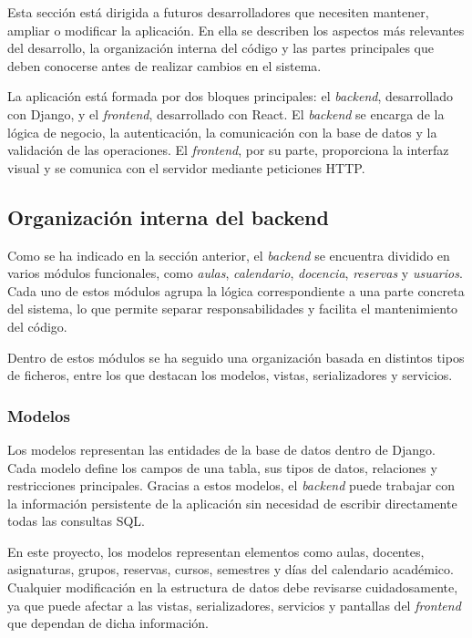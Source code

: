 Esta sección está dirigida a futuros desarrolladores que necesiten mantener, ampliar o modificar la aplicación. En ella se describen los aspectos más relevantes del desarrollo, la organización interna del código y las partes principales que deben conocerse antes de realizar cambios en el sistema.

La aplicación está formada por dos bloques principales: el \textit{backend}, desarrollado con Django, y el \textit{frontend}, desarrollado con React. El \textit{backend} se encarga de la lógica de negocio, la autenticación, la comunicación con la base de datos y la validación de las operaciones. El \textit{frontend}, por su parte, proporciona la interfaz visual y se comunica con el servidor mediante peticiones HTTP.

\subsection{Organización interna del backend}

Como se ha indicado en la sección anterior, el \textit{backend} se encuentra dividido en varios módulos funcionales, como \textit{aulas}, \textit{calendario}, \textit{docencia}, \textit{reservas} y \textit{usuarios}. Cada uno de estos módulos agrupa la lógica correspondiente a una parte concreta del sistema, lo que permite separar responsabilidades y facilita el mantenimiento del código.

Dentro de estos módulos se ha seguido una organización basada en distintos tipos de ficheros, entre los que destacan los modelos, vistas, serializadores y servicios.

\subsubsection{Modelos}

Los modelos representan las entidades de la base de datos dentro de Django. Cada modelo define los campos de una tabla, sus tipos de datos, relaciones y restricciones principales. Gracias a estos modelos, el \textit{backend} puede trabajar con la información persistente de la aplicación sin necesidad de escribir directamente todas las consultas SQL.

En este proyecto, los modelos representan elementos como aulas, docentes, asignaturas, grupos, reservas, cursos, semestres y días del calendario académico. Cualquier modificación en la estructura de datos debe revisarse cuidadosamente, ya que puede afectar a las vistas, serializadores, servicios y pantallas del \textit{frontend} que dependan de dicha información.

